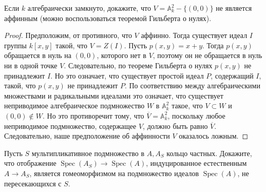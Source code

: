 \begin{prob}
Если $k$ алгебраически замкнуто, докажите, что $V=\mathbb{A}_k^2-\{(0,0)\}$ не является аффинным (можно воспользоваться теоремой Гильберта о нулях).
\end{prob}

\begin{proof}
Предположим, от противного, что $V$ аффинно. Тогда существует идеал $I$ группы $k[x,y]$ такой, что $V=Z(I)$. Пусть $p(x,y)=x+y$. Тогда $p(x,y)$ обращается в нуль на $(0,0)$, которого нет в $V$, поэтому он не обращается в нуль ни в одной точке $V$. Следовательно, по теореме Гильберта о нулях $p(x,y)$ не принадлежит $I$. Но это означает, что существует простой идеал $P$, содержащий $I$, такой, что $p(x,y)$ не принадлежит $P$. По соответствию между алгебраическими множествами и радикальными идеалами это означает, что существует неприводимое алгебраическое подмножество $W$ в $\mathbb{A}_k^2$ такое, что $V\subset W$ и $(0,0)\notin W$. Но это противоречит тому, что $\overline{V}=\mathbb{A}_k^2$, поскольку любое неприводимое подмножество, содержащее $V$, должно быть равно $\overline{V}$. Следовательно, наше предположение об аффинности $V$ оказалось ложным.
\end{proof}
\begin{comment}
Suppose, for a contradiction, that $V$ is affine. Then there exists an ideal $I$ of $k[x,y]$ such that $V=Z(I)$. Let $p(x,y)=x+y$. Then $p(x,y)$ vanishes on $(0,0)$, which is not in $V$, so it does not vanish on any point of $V$. Therefore, by Hilbert's zero theorem, $p(x,y)$ does not belong to the radical of $I$. But this implies that there exists a prime ideal $P$ containing $I$ such that $p(x,y)$ is not in $P$. By the correspondence between algebraic sets and radical ideals², this means that there is an irreducible algebraic subset $W$ of $\mathbb{A}_k^2$ such that $V\subset W$ and $(0,0)\notin W$. But this contradicts the fact that $\overline{V}=\mathbb{A}_k^2$, since any irreducible subset containing $V$ must be equal to $\overline{V}$. Therefore, our assumption that $V$ is affine was false.
\end{comment}
\vskip 0.6in




\begin{prob}
Пусть $S$ мультипликативное подмножество в $A, A_S$ кольцо частных. Докажите, что отображение $\operatorname{Spec}\left(A_S\right) \rightarrow \operatorname{Spec}(A)$, индуцированное естественным $A \rightarrow A_S$, является гомеоморфизмом на подмножество идеалов $\operatorname{Spec}(A)$, не пересекающихся с $S$.
\end{prob}

